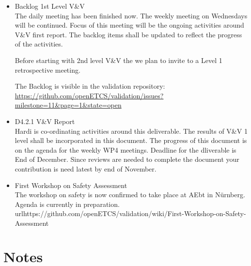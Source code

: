 \documentclass[a4paper, 11pt]{article}
\begin{document}
\begin{itemize}
\item Backlog 1st Level V\&V\\
The daily meeting has been finished now. The weekly meeting on Wednesdays will be continued. Focus of this meeting will be the ongoing activities around V\&V first report. The backlog items shall be updated to reflect the progress of the activities.

Before starting with 2nd level V\&V the we plan to invite to a Level 1 retrospective meeting.

The Backlog is visible in the validation repository:
\url{https://github.com/openETCS/validation/issues?milestone=11&page=1&state=open}\\

\item D4.2.1 V\&V Report\\
Hardi is co-ordinating activities around this deliverable. The results of V\&V 1 level shall be incorporated in this document. The progress of this document is on the agenda for the weekly WP4 meetings. Deadline for the dliverable is End of December. Since reviews are needed to complete the document your contribution is need latest by end of November.

\item First Workshop on Safety Assessment\\
The workshop on safety is now confirmed to take place at AEbt in N\"urnberg. Agenda is currently in preparation. url{https://github.com/openETCS/validation/wiki/First-Workshop-on-Safety-Assessment}

\end{itemize}


\section{Notes}
\end{document}
